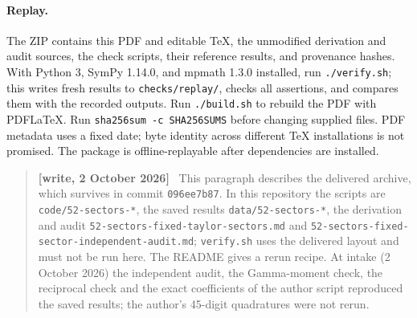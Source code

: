 \documentclass[11pt,letterpaper]{article}
\theoremstyle{remark}\newtheorem{remark}[theorem]{Remark}
\newenvironment{writenote}{\par\smallskip\begin{quote}\small\textbf{[write, 2 October 2026]}\ }{\end{quote}\smallskip}
\newcommand{\repopath}[1]{\nolinkurl{#1}}
\begin{document}
\paragraph{Replay.}
The ZIP contains this PDF and editable TeX, the unmodified derivation and audit sources, the check scripts, their reference results, and provenance hashes. With Python 3, SymPy 1.14.0, and mpmath 1.3.0 installed, run \texttt{./verify.sh}; this writes fresh results to \texttt{checks/replay/}, checks all assertions, and compares them with the recorded outputs. Run \texttt{./build.sh} to rebuild the PDF with PDFLaTeX. Run \texttt{sha256sum -c SHA256SUMS} before changing supplied files. PDF metadata uses a fixed date; byte identity across different TeX installations is not promised. The package is offline-replayable after dependencies are installed.
\begin{writenote}
This paragraph describes the delivered archive, which survives in commit \texttt{096ee7b87}. In this repository the scripts are \repopath{code/52-sectors-*}, the saved results \repopath{data/52-sectors-*}, the derivation and audit \repopath{52-sectors-fixed-taylor-sectors.md} and \repopath{52-sectors-fixed-sector-independent-audit.md}; \texttt{verify.sh} uses the delivered layout and must not be run here. The README gives a rerun recipe. At intake (2 October 2026) the independent audit, the Gamma-moment check, the reciprocal check and the exact coefficients of the author script reproduced the saved results; the author's 45-digit quadratures were not rerun.
\end{writenote}
\end{document}
